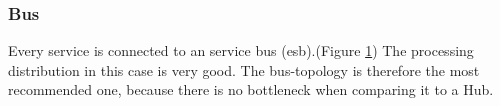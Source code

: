 \documentclass[12pt]{article}
\begin{document}
\subsubsection{Bus}
Every service is connected to an service bus (\gls{esb}).(Figure \ref{fig:eai2}) The processing distribution in this case is very good. The bus-topology is therefore the most recommended one, because there is no bottleneck when comparing it to a Hub.
\begin{figure}[here!]
\centering
\begin{minipage}[h]{0.3\textwidth}
\centering
    \label{fig:eai0}
\end{minipage}
\begin{minipage}[h]{0.3\textwidth}
\centering
    \label{fig:eai1}
\end{minipage}
\begin{minipage}[h]{0.3\textwidth}
\centering
    \label{fig:eai2}
\end{minipage}
\end{figure}
\FloatBarrier

\listoftables
\listoffigures
\printglossaries
\end{document}
